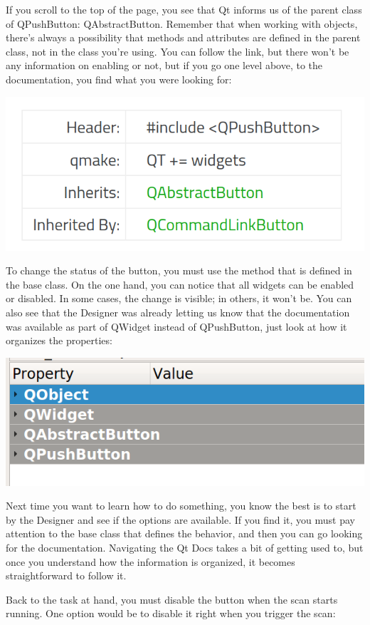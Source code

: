 If you scroll to the top of the page, you see that Qt informs us of the parent class of QPushButton: QAbstractButton. Remember that when working with objects, there's always a possibility that methods and attributes are defined in the parent class, not in the class you're using. You can follow the link, but there won't be any information on enabling or not, but if you go one level above, to the  documentation, you find what you were looking for:

\begin{center}
    \includegraphics[width=.4\linewidth]{images/Chapter_09/11_Qt_Docs_inheritance.png}
\end{center}

To change the status of the button, you must use the  method that is defined in the base  class. On the one hand, you can notice that all widgets can be enabled or disabled. In some cases, the change is visible; in others, it won't be. You can also see that the Designer was already letting us know that the documentation was available as part of QWidget instead of QPushButton, just look at how it organizes the properties:

\begin{center}
    \includegraphics[width=.4\linewidth]{images/Chapter_09/12_Designer_object_inheritance.png}
\end{center}

Next time you want to learn how to do something, you know the best is to start by the Designer and see if the options are available. If you find it, you must pay attention to the base class that defines the behavior, and then you can go looking for the documentation. Navigating the Qt Docs takes a bit of getting used to, but once you understand how the information is organized, it becomes straightforward to follow it.

Back to the task at hand, you must disable the button when the scan starts running. One option would be to disable it right when you trigger the scan:

